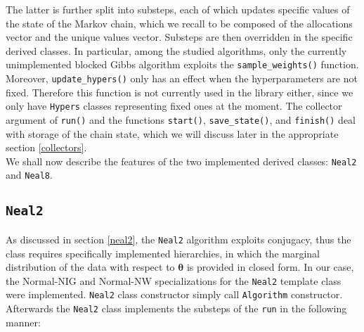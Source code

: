 The latter is further split into substeps, each of which updates specific values of the state of the Markov chain, which we recall to be composed of the allocations vector and the unique values vector.
Substeps are then overridden in the specific derived classes.
In particular, among the studied algorithms, only the currently unimplemented blocked Gibbs algorithm exploits the \verb|sample_weights()| function.
Moreover, \verb|update_hypers()| only has an effect when the hyperparameters are not fixed.
Therefore this function is not currently used in the library either, since we only have \verb|Hypers| classes representing fixed ones at the moment.
The collector argument of \verb|run()| and the functions \verb|start()|, \verb|save_state()|, and \verb|finish()| deal with storage of the chain state, which we will discuss later in the appropriate section \ref{collectors}. \\
We shall now describe the features of the two implemented derived classes: \verb|Neal2| and \verb|Neal8|.

\subsection{\texttt{Neal2}}
As discussed in section \ref{neal2}, the \verb|Neal2| algorithm exploits conjugacy, thus the class requires specifically implemented hierarchies, in which the marginal distribution of the data with respect to $\boldsymbol\theta$ is provided in closed form.
In our case, the Normal-NIG and Normal-NW specializations for the \verb|Neal2| template class were implemented.
\verb|Neal2| class constructor simply call \verb|Algorithm| constructor.
Afterwards the \verb|Neal2| class implements the substeps of the \verb|run| in the following manner:

